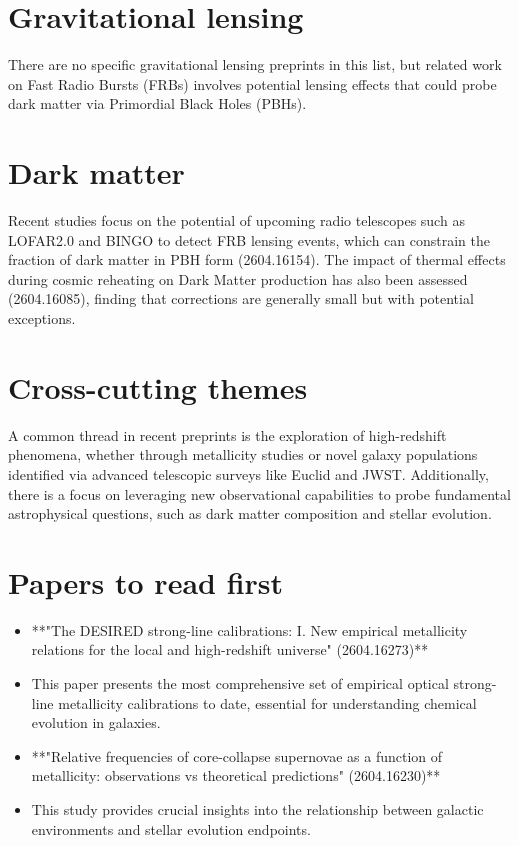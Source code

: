 \documentclass[11pt]{article}
\begin{document}
\section*{Gravitational lensing}
There are no specific gravitational lensing preprints in this list, but related work on Fast Radio Bursts (FRBs) involves potential lensing effects that could probe dark matter via Primordial Black Holes (PBHs).
\section*{Dark matter}
Recent studies focus on the potential of upcoming radio telescopes such as LOFAR2.0 and BINGO to detect FRB lensing events, which can constrain the fraction of dark matter in PBH form (2604.16154). The impact of thermal effects during cosmic reheating on Dark Matter production has also been assessed (2604.16085), finding that corrections are generally small but with potential exceptions.
\section*{Cross-cutting themes}
A common thread in recent preprints is the exploration of high-redshift phenomena, whether through metallicity studies or novel galaxy populations identified via advanced telescopic surveys like Euclid and JWST. Additionally, there is a focus on leveraging new observational capabilities to probe fundamental astrophysical questions, such as dark matter composition and stellar evolution.
\section*{Papers to read first}
\begin{itemize}
\item **"The DESIRED strong-line calibrations: I. New empirical metallicity relations for the local and high-redshift universe" (2604.16273)**
\item This paper presents the most comprehensive set of empirical optical strong-line metallicity calibrations to date, essential for understanding chemical evolution in galaxies.
\end{itemize}
\begin{itemize}
\item **"Relative frequencies of core-collapse supernovae as a function of metallicity: observations vs theoretical predictions" (2604.16230)**
\item This study provides crucial insights into the relationship between galactic environments and stellar evolution endpoints.
\end{itemize}
\end{document}
